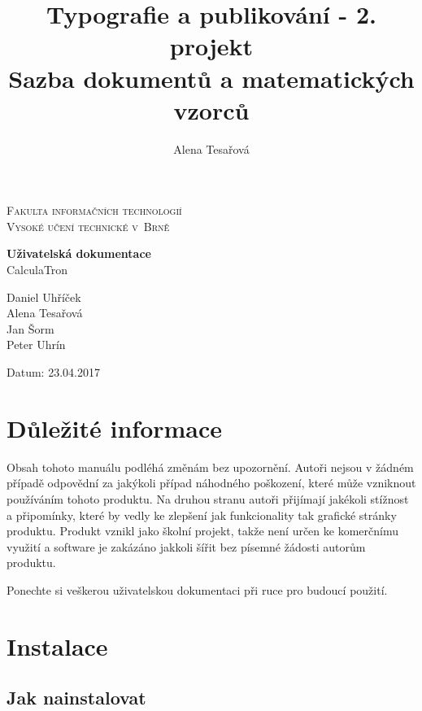 \documentclass[11pt,a4paper]{article}
\author{Alena Tesařová}
\title{Typografie a publikování - 2. projekt \\
		Sazba dokumentů a matematických vzorců \\}
\begin{document}
\begin{titlepage}
\begin{center}
\Huge
\textsc{Fakulta informačních technologií\\
Vysoké učení technické v~Brně}\\

\LARGE \textbf{Uživatelská dokumentace} \\CalculaTron\\

\end{center}

 \begin{flushright}
 {\Large Daniel Uhříček \\ Alena Tesařová \\Jan Šorm\\ Peter Uhrín \\} 
 \end{flushright}
 {\Large Datum: 23.04.2017 \hfill
 }\\
\end{titlepage}

\newpage
\tableofcontents
\newpage


\section{Důležité informace}
Obsah tohoto manuálu podléhá změnám bez upozornění. Autoři nejsou v žádném případě odpovědní za jakýkoli případ náhodného poškození, které může vzniknout používáním tohoto produktu. Na druhou stranu autoři přijímají jakékoli stížnost a připomínky, které by vedly ke zlepšení jak funkcionality tak grafické stránky produktu. Produkt vznikl jako školní projekt, takže není určen ke komerčnímu využití a software je zakázáno jakkoli šířit bez písemné žádosti autorům produktu.

Ponechte si veškerou uživatelskou dokumentaci při ruce pro budoucí použití.

\section{Instalace }

\subsection{Jak nainstalovat}
\end{document}
